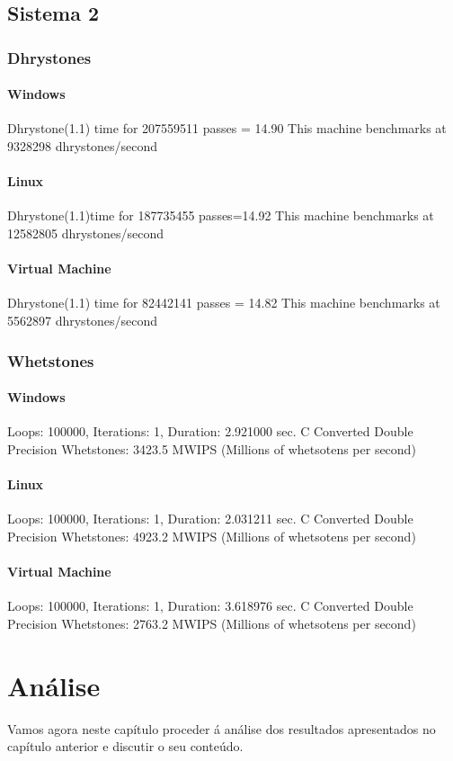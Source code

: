 \documentclass{report}
\begin{document}
\section{Sistema 2}
\subsection{Dhrystones}
\subsubsection{Windows}
Dhrystone(1.1) time for 207559511 passes = 14.90
This machine benchmarks at 9328298 dhrystones/second
\subsubsection{Linux}
Dhrystone(1.1)time for 187735455
passes=14.92
This machine benchmarks at 12582805 dhrystones/second
\subsubsection{Virtual Machine}
Dhrystone(1.1) time for 82442141 
passes = 14.82
This machine benchmarks at 5562897 dhrystones/second
\subsection{Whetstones}
\subsubsection{Windows}
Loops: 100000, Iterations: 1, Duration: 2.921000 sec.
C Converted Double Precision Whetstones: 3423.5 MWIPS (Millions of whetsotens per second)
\subsubsection{Linux}
Loops: 100000, Iterations: 1, Duration: 2.031211 sec.
C Converted Double Precision Whetstones: 4923.2 MWIPS (Millions of whetsotens per second)
\subsubsection{Virtual Machine}
Loops: 100000, Iterations: 1, Duration: 3.618976 sec.
C Converted Double Precision Whetstones: 2763.2 MWIPS (Millions of whetsotens per second)
\chapter{Análise}
\label{chap.analise}
Vamos agora neste capítulo proceder á análise dos resultados apresentados no capítulo anterior e discutir o seu conteúdo.
\end{document}
